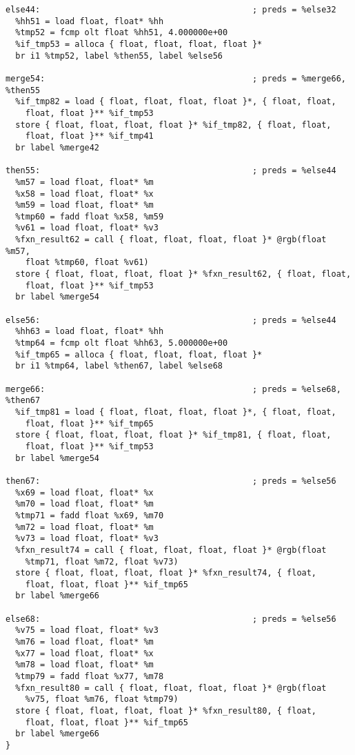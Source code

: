 \documentclass[main.tex]{subfiles}
\begin{document}
{\begin{lstlisting}
else44:                                           ; preds = %else32
  %hh51 = load float, float* %hh
  %tmp52 = fcmp olt float %hh51, 4.000000e+00
  %if_tmp53 = alloca { float, float, float, float }*
  br i1 %tmp52, label %then55, label %else56

merge54:                                          ; preds = %merge66, %then55
  %if_tmp82 = load { float, float, float, float }*, { float, float,
    float, float }** %if_tmp53
  store { float, float, float, float }* %if_tmp82, { float, float,
    float, float }** %if_tmp41
  br label %merge42

then55:                                           ; preds = %else44
  %m57 = load float, float* %m
  %x58 = load float, float* %x
  %m59 = load float, float* %m
  %tmp60 = fadd float %x58, %m59
  %v61 = load float, float* %v3
  %fxn_result62 = call { float, float, float, float }* @rgb(float %m57,
    float %tmp60, float %v61)
  store { float, float, float, float }* %fxn_result62, { float, float,
    float, float }** %if_tmp53
  br label %merge54

else56:                                           ; preds = %else44
  %hh63 = load float, float* %hh
  %tmp64 = fcmp olt float %hh63, 5.000000e+00
  %if_tmp65 = alloca { float, float, float, float }*
  br i1 %tmp64, label %then67, label %else68

merge66:                                          ; preds = %else68, %then67
  %if_tmp81 = load { float, float, float, float }*, { float, float,
    float, float }** %if_tmp65
  store { float, float, float, float }* %if_tmp81, { float, float,
    float, float }** %if_tmp53
  br label %merge54

then67:                                           ; preds = %else56
  %x69 = load float, float* %x
  %m70 = load float, float* %m
  %tmp71 = fadd float %x69, %m70
  %m72 = load float, float* %m
  %v73 = load float, float* %v3
  %fxn_result74 = call { float, float, float, float }* @rgb(float
    %tmp71, float %m72, float %v73)
  store { float, float, float, float }* %fxn_result74, { float,
    float, float, float }** %if_tmp65
  br label %merge66

else68:                                           ; preds = %else56
  %v75 = load float, float* %v3
  %m76 = load float, float* %m
  %x77 = load float, float* %x
  %m78 = load float, float* %m
  %tmp79 = fadd float %x77, %m78
  %fxn_result80 = call { float, float, float, float }* @rgb(float
    %v75, float %m76, float %tmp79)
  store { float, float, float, float }* %fxn_result80, { float, 
    float, float, float }** %if_tmp65
  br label %merge66
}


\end{lstlisting}}
\end{document}
